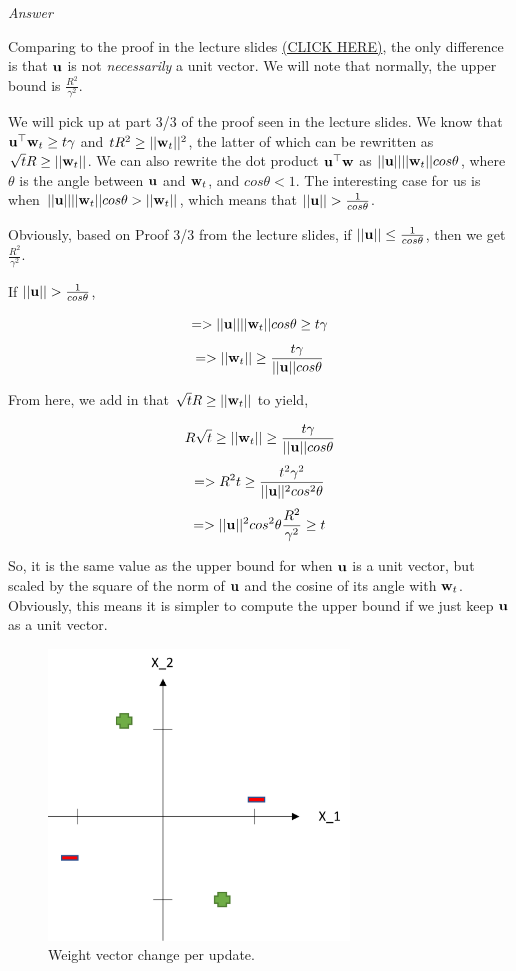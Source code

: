 \documentclass[12pt, fullpage,letterpaper]{article}
\begin{document}
\begin{enumerate}
	\emph{Answer}
	
	Comparing to the proof in the lecture slides \href{https://www.cs.utah.edu/~zhe/teach/pdf/Perceptron.pdf}{(CLICK HERE)}, the only difference is that ${\bf u}$ is not \emph{necessarily} a unit vector. We will note that normally, the upper bound is $\frac{R^2}{\gamma^2}$.
	
	We will pick up at part 3/3 of the proof seen in the lecture slides. We know that ${\bf u}^\top {\bf w}_t \geq t \gamma$ and $t R^2 \geq ||{\bf w}_t||^2$, the latter of which can be rewritten as $\sqrt{t} R \geq ||{\bf w}_t||$. We can also rewrite the dot product ${\bf u}^\top {\bf w}$ as $||{\bf u}|| ||{\bf w}_t|| cos\theta$, where $\theta$ is the angle between ${\bf u}$ and ${\bf w}_t$, and $cos\theta < 1$. The interesting case for us is when $||{\bf u}|| ||{\bf w}_t|| cos\theta > ||{\bf w}_t||$, which means that $||{\bf u}|| > \frac{1}{cos\theta}$. 
	
	Obviously, based on Proof 3/3 from the lecture slides, if $||{\bf u}|| \leq \frac{1}{cos\theta}$, then we get $\frac{R^2}{\gamma^2}$.
	
	If $||{\bf u}|| > \frac{1}{cos\theta}$,
	
	\[
	    => ||{\bf u}|| ||{\bf w}_t|| cos\theta \geq t\gamma
	\]
	\[
	    => ||{\bf w}_t|| \geq \frac{t\gamma}{||{\bf u}|| cos\theta}
	\]
	
	From here, we add in that $\sqrt{t} R \geq ||{\bf w}_t||$ to yield,
	
	\[
	    R \sqrt{t} \geq ||{\bf w}_t|| \geq \frac{t\gamma}{||{\bf u}|| cos\theta}
	\]
	\[
	    => R^2 t \geq \frac{t^2 \gamma^2}{||{\bf u}||^2 cos^2\theta}
	\]
	\[
	    => ||{\bf u}||^2 cos^2\theta \frac{R^2}{\gamma^2} \geq t
	\]
	
	So, it is the same value as the upper bound for when ${\bf u}$ is a unit vector, but scaled by the square of the norm of ${\bf u}$ and the cosine of its angle with ${\bf w}_t$. Obviously, this means it is simpler to compute the upper bound if we just keep ${\bf u}$ as a unit vector.
	
	\begin{figure}[htp]
        \centering
        \includegraphics[width=8cm]{part1_q5.png}
        \caption{Weight vector change per update.}
        \label{fig:q2b_weights}
    \end{figure}
	

\end{enumerate}
\end{document}
